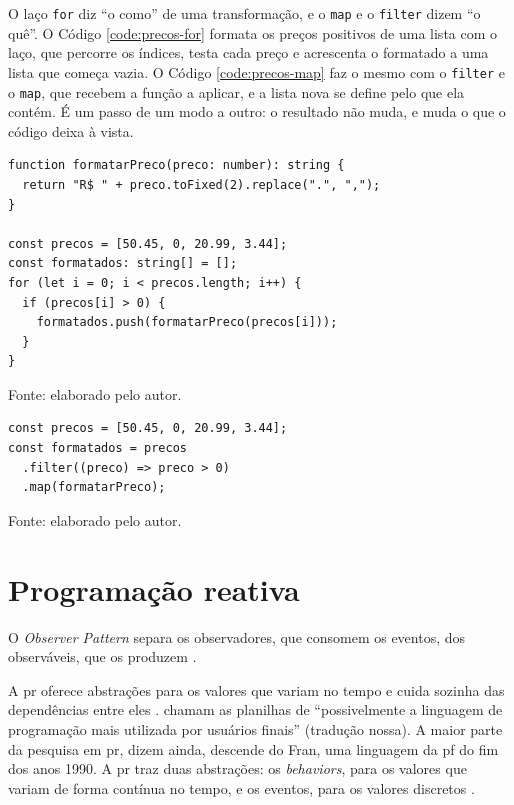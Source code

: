 O laço \texttt{for} diz “o como” de uma transformação, e o \texttt{map} e o \texttt{filter}
dizem “o quê”.
O Código \ref{code:precos-for} formata os preços positivos de uma lista
com o laço, que percorre os índices, testa cada preço e acrescenta o
formatado a uma lista que começa vazia.
O Código \ref{code:precos-map} faz o mesmo com o \texttt{filter} e o \texttt{map}, que
recebem a função a aplicar, e a lista nova se define pelo que ela contém.
É um passo de um modo a outro: o resultado não muda, e muda o que o código
deixa à vista.

  \begin{listing}[htbp]
    \caption{Os preços positivos formatados com o laço \texttt{for}.}
    \begin{verbatim}
function formatarPreco(preco: number): string {
  return "R$ " + preco.toFixed(2).replace(".", ",");
}

const precos = [50.45, 0, 20.99, 3.44];
const formatados: string[] = [];
for (let i = 0; i < precos.length; i++) {
  if (precos[i] > 0) {
    formatados.push(formatarPreco(precos[i]));
  }
}
    \end{verbatim}
    \small Fonte: elaborado pelo autor.
    \label{code:precos-for}
  \end{listing}

  \begin{listing}[htbp]
    \caption{Os mesmos preços formatados com o \texttt{filter} e o
      \texttt{map}, com a \texttt{formatarPreco} do
      Código~\ref{code:precos-for}.}
    \begin{verbatim}
const precos = [50.45, 0, 20.99, 3.44];
const formatados = precos
  .filter((preco) => preco > 0)
  .map(formatarPreco);
    \end{verbatim}
    \small Fonte: elaborado pelo autor.
    \label{code:precos-map}
  \end{listing}
\section{Programação reativa}
\label{sec:programacao-reativa}

O \emph{Observer Pattern} separa os observadores, que consomem os eventos, dos
observáveis, que os produzem \cite[p. 953]{salvaneschi2015}.

A \gls{pr} oferece abstrações para os valores que variam no tempo e
cuida sozinha das dependências entre eles
\cite[p. 52:1]{bainomugisha2013}.
\textcite[p. 52:2]{bainomugisha2013} chamam as planilhas de “possivelmente a
linguagem de programação mais utilizada por usuários finais” (tradução nossa).
A maior parte da pesquisa em \gls{pr}, dizem ainda, descende do Fran, uma
linguagem da \gls{pf} do fim dos anos 1990.
A \gls{pr} traz duas abstrações: os \emph{behaviors}, para os valores que variam de forma contínua
no tempo, e os eventos, para os valores discretos
\cite[p. 52:2]{bainomugisha2013}.

